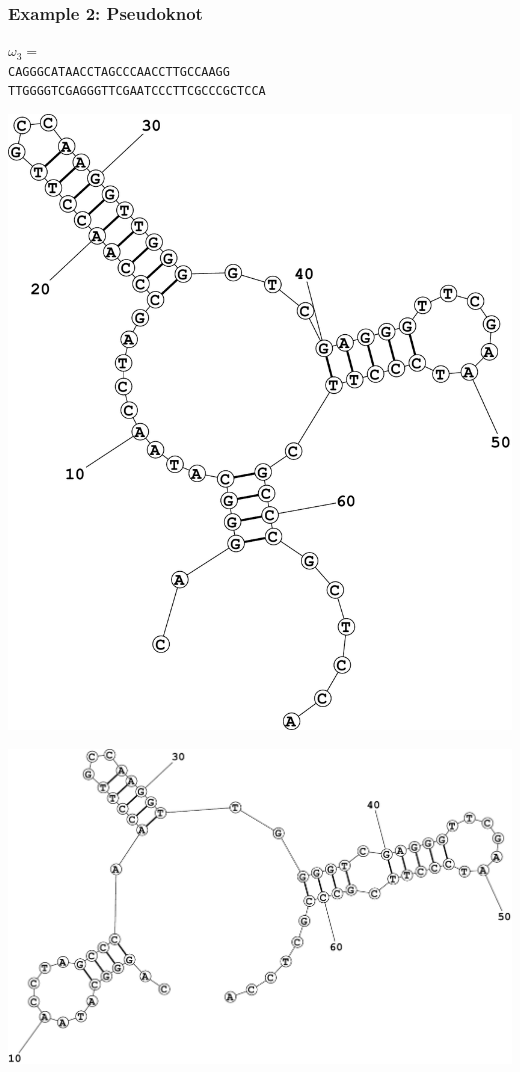 \documentclass[xcolor=table]{beamer}
\begin{document}
\begin{frame}[fragile]
  \transwipe[direction=90]
  \frametitle{Example 2: Pseudoknot}
\centering
 $\omega_3=$ \texttt{\\CAGGGCATAACCTAGCCCAACCTTGCCAAGG\\TTGGGGTCGAGGGTTCGAATCCCTTCGCCCGCTCCA}
\vspace{1cm}
\begin{minipage}[t]{0.48\textwidth}
\centering
\includegraphics[width=.94\textwidth]{pictures/Fold1.pdf}
\end{minipage}
\begin{minipage}[t]{0.48\textwidth}
\centering
\includegraphics[width=.94\textwidth]{pictures/Fold2.pdf}
\end{minipage}

\end{frame}
\end{document}
